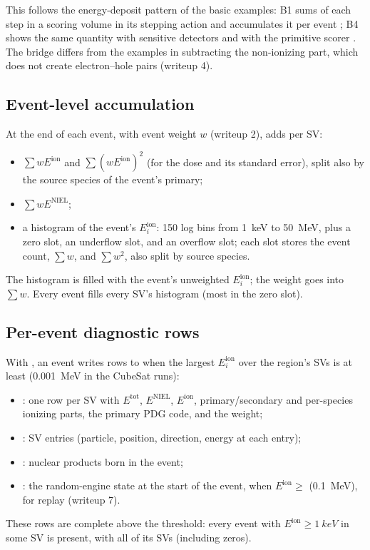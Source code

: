 This follows the energy-deposit pattern of the \gfour{} basic examples: B1 sums  of each step in a scoring volume in its stepping action and accumulates it per event \citep{g4exampleB1}; B4 shows the same quantity with sensitive detectors and with the  primitive scorer \citep{g4exampleB4}. The bridge differs from the examples in subtracting the non-ionizing part, which does not create electron--hole pairs (writeup 4).

\subsection{Event-level accumulation}
At the end of each event, with event weight $w$ (writeup 2),  adds per SV:
\begin{itemize}
  \item $\sum w E^{\text{ion}}$ and $\sum (wE^{\text{ion}})^2$ (for the dose and its standard error), split also by the source species of the event's primary;
  \item $\sum w E^{\text{NIEL}}$;
  \item a histogram of the event's $E^{\text{ion}}_i$: 150 log bins from \SI{1}{keV} to \SI{50}{MeV}, plus a zero slot, an underflow slot, and an overflow slot; each slot stores the event count, $\sum w$, and $\sum w^2$, also split by source species.
\end{itemize}
The histogram is filled with the event's unweighted $E^{\text{ion}}_i$; the weight goes into $\sum w$. Every event fills every SV's histogram (most in the zero slot).

\subsection{Per-event diagnostic rows}
With , an event writes rows to  when the largest $E^{\text{ion}}_i$ over the region's SVs is at least  (\SI{0.001}{MeV} in the CubeSat runs):
\begin{itemize}
  \item {}: one row per SV with $E^{\text{tot}}$, $E^{\text{NIEL}}$, $E^{\text{ion}}$, primary/secondary and per-species ionizing parts, the primary PDG code, and the weight;
  \item {}: SV entries (particle, position, direction, energy at each entry);
  \item {}: nuclear products born in the event;
  \item {}: the random-engine state at the start of the event, when $E^{\text{ion}}\ge$  (\SI{0.1}{MeV}), for replay (writeup 7).
\end{itemize}
These rows are complete above the threshold: every event with $E^{\text{ion}}\ge\SI{1}{keV}$ in some SV is present, with all of its SVs (including zeros).

